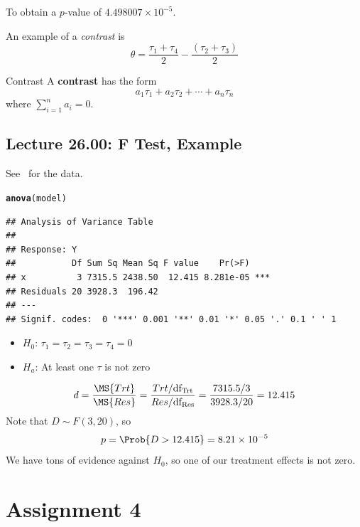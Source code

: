 \documentclass[oneside]{book}\usepackage[]{graphicx}\usepackage[dvipsnames,table,xcdraw]{xcolor}
\makeatletter
\newcommand{\hlstd}[1]{\textcolor[rgb]{0.345,0.345,0.345}{#1}}%
\newcommand{\hlkwd}[1]{\textcolor[rgb]{0.737,0.353,0.396}{\textbf{#1}}}%
\newenvironment{kframe}{%
 \def\at@end@of@kframe{}%
 \ifinner\ifhmode%
  \def\at@end@of@kframe{\end{minipage}}%
  \begin{minipage}{\columnwidth}%
 \fi\fi%
 \def\FrameCommand##1{\hskip\@totalleftmargin \hskip-\fboxsep
 \colorbox{shadecolor}{##1}\hskip-\fboxsep
     \hskip-\linewidth \hskip-\@totalleftmargin \hskip\columnwidth}%
 \MakeFramed {\advance\hsize-\width
   \@totalleftmargin\z@ \linewidth\hsize
   \@setminipage}}%
 {\par\unskip\endMakeFramed%
 \at@end@of@kframe}
\newenvironment{knitrout}{}{} %
\let\SS=\relax
\makeatother
\begin{document}
    To obtain a $ p $-value of $ 4.498007\times 10^{-5} $.
\begin{Example}{}{}
    An example of a \emph{contrast} is
    \[ \theta=\frac{\tau_1+\tau_4}{2} -\frac{(\tau_2+\tau_3)}{2}  \]
\end{Example}
\begin{Definition}{Contrast}{}
    A \textbf{contrast} has the form
    \[ a_1\tau_1+a_2\tau_2+\cdots+a_n\tau_n \]
    where $ \sum_{i=1}^{n} a_i=0 $.
\end{Definition}



\section{Lecture 26.00: F Test, Example}

See~ for the data.

\begin{knitrout}
\color{fgcolor}\begin{kframe}
\begin{alltt}
\hlkwd{anova}\hlstd{(model)}
\end{alltt}
\begin{verbatim}
## Analysis of Variance Table
## 
## Response: Y
##           Df Sum Sq Mean Sq F value    Pr(>F)    
## x          3 7315.5 2438.50  12.415 8.281e-05 ***
## Residuals 20 3928.3  196.42                      
## ---
## Signif. codes:  0 '***' 0.001 '**' 0.01 '*' 0.05 '.' 0.1 ' ' 1
\end{verbatim}
\end{kframe}
\end{knitrout}
\begin{itemize}
    \item $ H_0 $: $ \tau_1=\tau_2=\tau_3=\tau_4=0 $
    \item $ H_a $: At least one $ \tau $ is not zero
\end{itemize}
\[ d=\frac{\MS{Trt}}{\MS{Res}} =\frac{\SS{Trt}/\text{df}_\text{Trt}}{\SS{Res}/\text{df}_\text{Res}}
    =\frac{7315.5/3}{3928.3/20}=12.415   \]
Note that $ D \sim F(3,20) $, so
\[ p=\Prob{D>12.415}=8.21 \times 10^{-5} \]
We have tons of evidence against $ H_0 $, so one of our treatment effects is not zero.


\chapter{Assignment 4}
\end{document}
